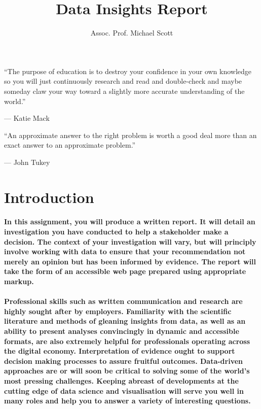\documentclass{../../fal_assignment}
\title{Data Insights Report}
\author{Assoc. Prof. Michael Scott}
\begin{document}
\maketitle

\begin{marginquote}
    ``The purpose of education is to destroy your confidence in your own knowledge so you will just continuously research and read and double-check and maybe someday claw your way toward a slightly more accurate understanding of the world.''
    
    --- Katie Mack
    
    \marginquoterule
    
  ``An approximate answer to the right problem is worth a good deal more than an exact answer to an approximate problem.''
    
    --- John Tukey
\end{marginquote}

\section*{Introduction}

\paragraph{
In this assignment, you will produce a written report. It will detail an investigation you have conducted to help a stakeholder make a decision. The context of your investigation will vary, but will principly involve working with data to ensure that your recommendation not merely an opinion but has been informed by evidence. The report will take the form of an accessible web page prepared using appropriate markup.
}

\paragraph{
Professional skills such as written communication and research are highly sought after by employers. Familiarity with the scientific literature and methods of gleaning insights from data, as well as an ability to present analyses convincingly in dynamic and accessible formats, are also extremely helpful for professionals operating across the digital economy. Interpretation of evidence ought to support decision making processes to assure fruitful outcomes. Data-driven approaches are or will soon be critical to solving some of the world's most pressing challenges. Keeping abreast of developments at the cutting edge of data science and visualisation will serve you well in many roles and help you to answer a variety of interesting questions. 
}
\end{document}
